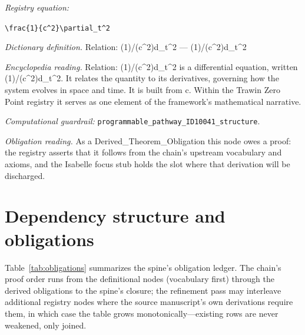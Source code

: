 \documentclass[11pt]{article}
\theoremstyle{remark}
\begin{document}
\noindent\textit{Registry equation:}\par
{\small\texttt{\textbackslash{}frac\{1\}\{c\textasciicircum{}2\}\textbackslash{}partial\_t\textasciicircum{}2}}\par\medskip
\noindent\textit{Dictionary definition.} Relation: (1)/(c\textasciicircum{}2)d\_t\textasciicircum{}2 --- (1)/(c\textasciicircum{}2)d\_t\textasciicircum{}2\par\medskip
\noindent\textit{Encyclopedia reading.} Relation: (1)/(c\textasciicircum{}2)d\_t\textasciicircum{}2 is a differential equation, written (1)/(c\textasciicircum{}2)d\_t\textasciicircum{}2. It relates the quantity to its derivatives, governing how the system evolves in space and time. It is built from c. Within the Trawin Zero Point registry it serves as one element of the framework's mathematical narrative.
\par\medskip\noindent\textit{Computational guardrail:} \texttt{programmable\_pathway\_ID10041\_structure}.
\par\medskip\noindent\textit{Obligation reading.} As a Derived\_Theorem\_Obligation this node owes a proof: the registry asserts that it follows from the chain's upstream vocabulary and axioms, and the Isabelle focus stub holds the slot where that derivation will be discharged.

\section{Dependency structure and obligations}
\label{sec:dep}

Table~\ref{tab:obligations} summarizes the spine's obligation ledger. The chain's proof order runs from the definitional nodes (vocabulary first) through the derived obligations to the spine's closure; the refinement pass may interleave additional registry nodes where the source manuscript's own derivations require them, in which case the table grows monotonically---existing rows are never weakened, only joined.
\end{document}
